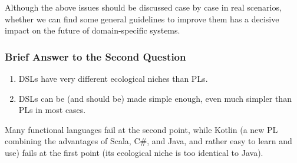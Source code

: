\documentclass[11pt]{article}
\begin{document}
Although the above issues should be discussed case by case in real scenarios, whether we can find some general guidelines to improve them has a decisive impact on the future of domain-specific systems.

\subsubsection*{Brief Answer to the Second Question}
\begin{enumerate}
    \item DSLs have very different ecological niches than PLs.
    \item DSLs can be (and should be) made simple enough, even much simpler than PLs in most cases.
\end{enumerate}
Many functional languages fail at the second point, while Kotlin (a new PL combining the advantages of Scala, C\#, and Java, and rather easy to learn and use) fails at the first point (its ecological niche is too identical to Java).



\end{document}
